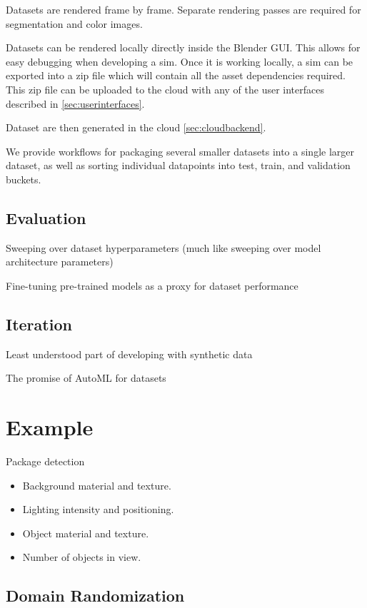 \documentclass{article}
\begin{document}
Datasets are rendered frame by frame. Separate rendering passes are required for segmentation and color images.

Datasets can be rendered locally directly inside the Blender GUI. This allows for easy debugging when developing a sim. Once it is working locally, a sim can be exported into a zip file which will contain all the asset dependencies required. This zip file can be uploaded to the cloud with any of the user interfaces described in \ref{sec:userinterfaces}.

Dataset are then generated in the cloud \ref{sec:cloudbackend}.

We provide workflows for packaging several smaller datasets into a single larger dataset, as well as sorting individual datapoints into test, train, and validation buckets.

\subsection{Evaluation}
\label{sec:evaluation}

Sweeping over dataset hyperparameters (much like sweeping over model architecture parameters)

Fine-tuning pre-trained models as a proxy for dataset performance

\subsection{Iteration}
\label{sec:iteration}

Least understood part of developing with synthetic data

The promise of AutoML for datasets


\section{Example}
\label{sec:example}

Package detection

\begin{itemize}
	\item Background material and texture.
	\item Lighting intensity and positioning.
	\item Object material and texture.
	\item Number of objects in view.
\end{itemize}

\subsection{Domain Randomization}
\label{sec:domainrandomization}
\end{document}
